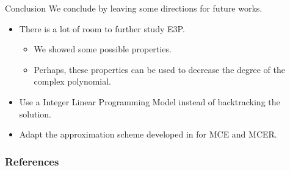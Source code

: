 \documentclass{beamer}
\theoremstyle{definition}
\begin{document}
\begin{frame}{Conclusion}
	We conclude by leaving some directions for future works.
	\begin{itemize}
		\item There is a lot of room to further study E3P.
		\begin{itemize}
			\item We showed some possible properties.
			\item Perhaps, these properties can be used to decrease the degree of the complex polynomial.
		\end{itemize}
		\item Use a Integer Linear Programming Model instead of backtracking the solution.
		\item Adapt the approximation scheme developed in \cite{cabello:2006} for MCE and MCER.
	\end{itemize}
\end{frame}

\begin{frame}[allowframebreaks]
	\frametitle{References}
	
	
\end{frame}
	
\end{document}
